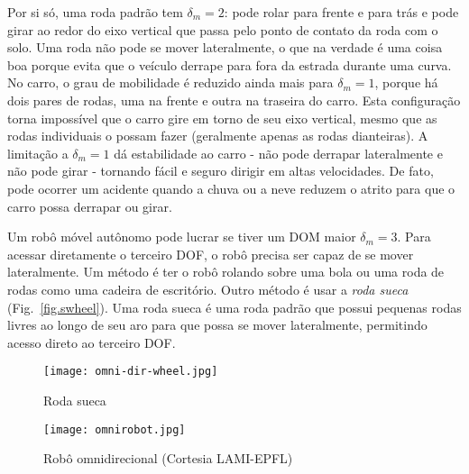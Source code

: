 Por si só, uma roda padrão tem $\delta_m=2$: pode rolar para frente e para trás e pode girar ao redor do eixo vertical que passa pelo ponto de contato da roda com o solo. Uma roda não pode se mover lateralmente, o que na verdade é uma coisa boa porque evita que o veículo derrape para fora da estrada durante uma curva. No carro, o grau de mobilidade é reduzido ainda mais para $\delta_m=1$, porque há dois pares de rodas, uma na frente e outra na traseira do carro. Esta configuração torna impossível que o carro gire em torno de seu eixo vertical, mesmo que as rodas individuais o possam fazer (geralmente apenas as rodas dianteiras). A limitação a $\delta_m=1$ dá estabilidade ao carro - não pode derrapar lateralmente e não pode girar - tornando fácil e seguro dirigir em altas velocidades. De fato, pode ocorrer um acidente quando a chuva ou a neve reduzem o atrito para que o carro possa derrapar ou girar.

Um robô móvel autônomo pode lucrar se tiver um DOM maior $\delta_m = 3$. Para acessar diretamente o terceiro DOF, o robô precisa ser capaz de se mover lateralmente. Um método é ter o robô rolando sobre uma bola ou uma roda de rodas como uma cadeira de escritório. Outro método é usar a \emph{roda sueca} (Fig.~\ref{fig.swheel}). Uma roda sueca é uma roda padrão que possui pequenas rodas livres ao longo de seu aro para que possa se mover lateralmente, permitindo acesso direto ao terceiro DOF.

\begin{figure}
\begin{minipage}{.45\textwidth}
\texttt{[image: omni-dir-wheel.jpg]}
\caption{Roda sueca}\label{fig.swheel}
\end{minipage}
\hspace{\fill}
\begin{minipage}{.45\textwidth}\texttt{[image: omnirobot.jpg]}
\caption{Robô omnidirecional (Cortesia LAMI-EPFL)}\label{fig.omni-robot}
\end{minipage}
\end{figure}



